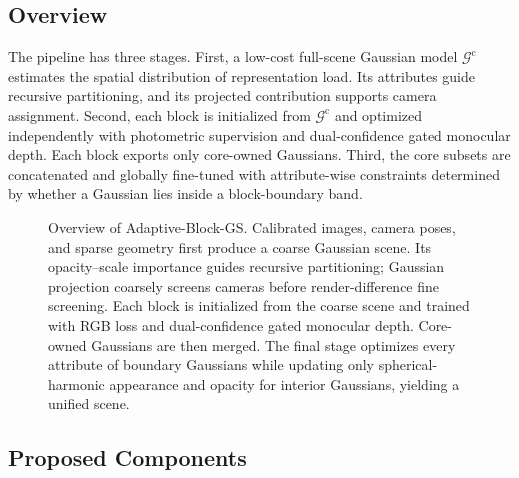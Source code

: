 \documentclass[conference]{IEEEtran}
\newcommand{\method}{Adaptive-Block-GS}
\begin{document}
\subsection{Overview}

The pipeline has three stages. First, a low-cost full-scene Gaussian model $\mathcal{G}^{\mathrm{c}}$ estimates the spatial distribution of representation load. Its attributes guide recursive partitioning, and its projected contribution supports camera assignment. Second, each block is initialized from $\mathcal{G}^{\mathrm{c}}$ and optimized independently with photometric supervision and dual-confidence gated monocular depth. Each block exports only core-owned Gaussians. Third, the core subsets are concatenated and globally fine-tuned with attribute-wise constraints determined by whether a Gaussian lies inside a block-boundary band.

\begin{figure}[t]
    \centering
    \caption{Overview of \method. Calibrated images, camera poses, and sparse geometry first produce a coarse Gaussian scene. Its opacity--scale importance guides recursive partitioning; Gaussian projection coarsely screens cameras before render-difference fine screening. Each block is initialized from the coarse scene and trained with RGB loss and dual-confidence gated monocular depth. Core-owned Gaussians are then merged. The final stage optimizes every attribute of boundary Gaussians while updating only spherical-harmonic appearance and opacity for interior Gaussians, yielding a unified scene.}
    \label{fig:overview}
\end{figure}

\subsection{Proposed Components}
\end{document}
